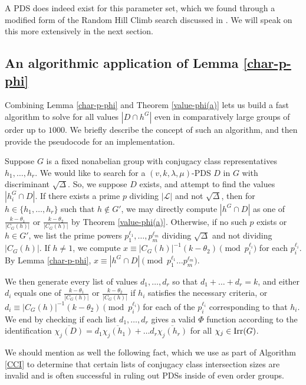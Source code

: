 \documentclass[12pt]{amsproc} %
\theoremstyle{definition}\newtheorem{defn}[thm]{Definition}
\theoremstyle{definition}\newtheorem{rem}[thm]{Remark}
\theoremstyle{definition}\newtheorem{ex}[thm]{Example}
\newcommand{\Irr}{{\rm Irr}}
\begin{document}
A PDS does indeed exist for this parameter set, which we found through a modified form of the Random Hill Climb search discussed in \cite{brady}. We will speak on this more extensively in the next section.

\subsection{An algorithmic application of Lemma \ref{char-p-phi}}

Combining Lemma \ref{char-p-phi} and Theorem \ref{value-phi(a)} lets us build a fast algorithm to solve for all values $|D\cap h^G|$ even in comparatively large groups of order up to $1000$. We briefly describe the concept of such an algorithm, and then provide the pseudocode for an implementation.

Suppose $G$ is a fixed nonabelian group with conjugacy class representatives $h_1, \dots, h_r$. We would like to search for a $(v, k, \lambda, \mu)$-PDS $D$ in $G$ with discriminant $\sqrt\Delta$. So, we suppose $D$ exists, and attempt to find the values $|h_i^G \cap D|$. If there exists a prime $p$ dividing $|\mathcal{L}|$ and not $\sqrt\Delta$, then for $h \in \{h_1, \dots, h_r\}$ such that $h \not \in G'$, we may directly compute $|h^G \cap D|$ as one of $\frac{k-\theta_1}{|C_G(h)|}$ or $\frac{k-\theta_2}{|C_G(h)|}$ by Theorem \ref{value-phi(a)}. Otherwise, if no such $p$ exists or $h \in G'$, we list the prime powers $p_1^{\ell_1}, \dots, p_m^{\ell_m}$ dividing $\sqrt\Delta$ and not dividing $|C_G(h)|$. If $h \neq 1$, we compute $x \equiv |C_G(h)|^{-1}(k - \theta_2) \pmod{p_i^{\ell_i}}$ for each $p_i^{\ell_i}$. By Lemma \ref{char-p-phi}, $x\equiv |h^G \cap D| \pmod{p_1^{\ell_1}\dots p_m^{\ell_m}}$.

We then generate every list of values $d_1, \dots, d_r$ so that $d_1 + \dots + d_r = k$, and either $d_i$ equals one of $\frac{k-\theta_1}{|C_G(h)|}$ or $\frac{k-\theta_2}{|C_G(h)|}$ if $h_i$ satisfies the necessary criteria, or $d_i \equiv |C_G(h)|^{-1}(k - \theta_2) \pmod{p_i^{\ell_i}}$ for each of the $p_i^{\ell_i}$ corresponding to that $h_i$. We end by checking if each list $d_1, \dots, d_r$ gives a valid $\Phi$ function according to the identification $\overline{\chi_j(D)} = d_1\overline{\chi_j(h_1)} + \dots d_r\overline{\chi_j(h_r)}$ for all $\chi_j \in \Irr(G)$.

We should mention as well the following fact, which we use as part of Algorithm \ref{CCI} to determine that certain lists of conjugacy class intersection sizes are invalid and is often successful in ruling out PDSs inside of even order groups.
\end{document}
